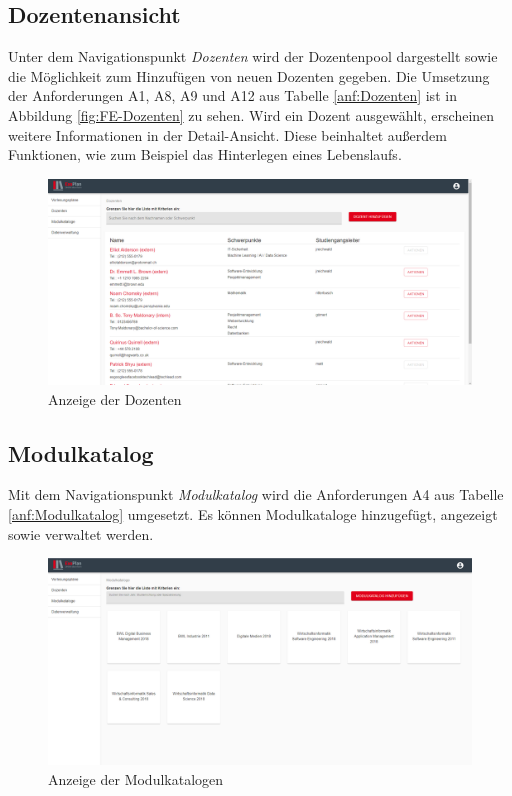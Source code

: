 \subsection{Dozentenansicht}
Unter dem Navigationspunkt \textit{Dozenten} wird der Dozentenpool dargestellt sowie die Möglichkeit zum Hinzufügen von neuen Dozenten gegeben.
Die Umsetzung der Anforderungen A1, A8, A9 und A12 aus Tabelle \ref{anf:Dozenten} ist in Abbildung \vref{fig:FE-Dozenten} zu sehen.
Wird ein Dozent ausgewählt, erscheinen weitere Informationen in der Detail-Ansicht. Diese beinhaltet außerdem Funktionen, wie zum Beispiel das Hinterlegen eines Lebenslaufs.
\begin{figure}[H]
	\centering 
	\includegraphics[width=\textwidth]{img/FrontEnd/Dozenten.png}
	\caption[Anzeige der Dozenten]{\label{fig:FE-Dozenten}Anzeige der Dozenten}
\end{figure}

\subsection{Modulkatalog}
Mit dem Navigationspunkt \textit{Modulkatalog} wird die Anforderungen A4 aus Tabelle \ref{anf:Modulkatalog} umgesetzt. 
Es können Modulkataloge hinzugefügt, angezeigt sowie verwaltet werden. 
\begin{figure}[H]
	\centering 
	\includegraphics[width=\textwidth]{img/FrontEnd/Modulkataloge.png}
	\caption[Anzeige der Modulkatalogen]{\label{fig:FE-Modulkataloge}Anzeige der Modulkatalogen}
\end{figure}

